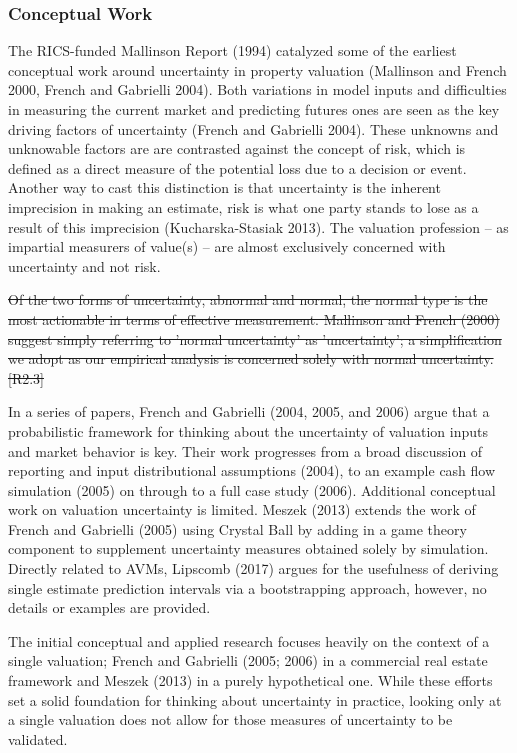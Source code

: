 \documentclass[colTwo]{anon}
\theoremstyle{definition}
\begin{document}
\subsubsection{Conceptual Work}

The RICS-funded Mallinson Report (1994) catalyzed some of the earliest conceptual work around uncertainty in property valuation (Mallinson and French 2000, French and Gabrielli 2004). Both variations in model inputs and difficulties in measuring the current market and predicting futures ones are seen as the key driving factors of uncertainty (French and Gabrielli 2004). These unknowns and unknowable factors are are contrasted against the concept of risk, which is defined as a direct measure of the potential loss due to a decision or event.  Another way to cast this distinction is that uncertainty is the inherent imprecision in making an estimate, risk is what one party stands to lose as a result of this imprecision (Kucharska-Stasiak 2013).  The valuation profession -- as impartial measurers of value(s) -- are almost exclusively concerned with uncertainty and not risk.

\st{Of the two forms of uncertainty, abnormal and normal, the normal type is the most actionable in terms of effective measurement.  Mallinson and French (2000) suggest simply referring to 'normal uncertainty' as 'uncertainty'; a simplification we adopt as our empirical analysis is concerned solely with normal uncertainty.[R2.3]}    

In a series of papers, French and Gabrielli (2004, 2005, and 2006) argue that a probabilistic framework for thinking about the uncertainty of valuation inputs and market behavior is key. Their work progresses from a broad discussion of reporting and input distributional assumptions (2004), to an example cash flow simulation (2005) on through to a full case study (2006). Additional conceptual work on valuation uncertainty is limited.  Meszek (2013) extends the work of French and Gabrielli (2005) using Crystal Ball by adding in a game theory component to supplement uncertainty measures obtained solely by simulation.  Directly related to AVMs, Lipscomb (2017) argues for the usefulness of deriving single estimate prediction intervals via a bootstrapping approach, however, no details or examples are provided. 

The initial conceptual and applied research focuses heavily on the context of a single valuation; French and Gabrielli (2005; 2006) in a commercial real estate framework and Meszek (2013) in a purely hypothetical one. While these efforts set a solid foundation for thinking about uncertainty in practice, looking only at a single valuation does not allow for those measures of uncertainty to be validated. 
\end{document}
